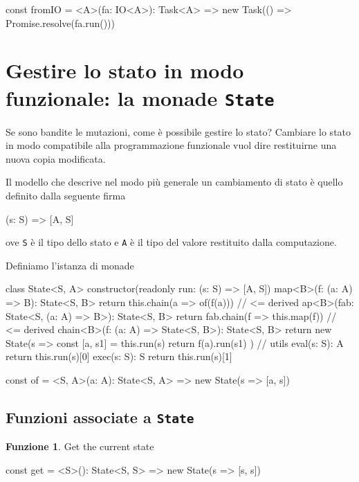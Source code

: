 \documentclass[12pt]{article}
\theoremstyle{definition}
\newtheorem{function}{Funzione}[section]
\newenvironment{code}
  {\vspace{0.5cm} \VerbatimEnvironment\begin{typescriptcode}}
  {\end{typescriptcode} \vspace{0.2cm}}
\begin{document}
\begin{code}
const fromIO = <A>(fa: IO<A>): Task<A> =>
  new Task(() => Promise.resolve(fa.run()))
\end{code}

\newpage

\section{Gestire lo stato in modo funzionale: la monade \texttt{State}}

Se sono bandite le mutazioni, come è possibile gestire lo stato?
Cambiare lo stato in modo compatibile alla programmazione funzionale vuol dire restituirne una nuova copia modificata.

Il modello che descrive nel modo più generale un cambiamento di stato è quello definito dalla seguente firma

\begin{code}
(s: S) => [A, S]
\end{code}

ove \texttt{S} è il tipo dello stato e \texttt{A} è il tipo del valore restituito dalla computazione.

Definiamo l'istanza di monade

\begin{code}
class State<S, A> {
  constructor(readonly run: (s: S) => [A, S]) {}
  map<B>(f: (a: A) => B): State<S, B> {
    return this.chain(a => of(f(a))) // <= derived
  }
  ap<B>(fab: State<S, (a: A) => B>): State<S, B> {
    return fab.chain(f => this.map(f)) // <= derived
  }
  chain<B>(f: (a: A) => State<S, B>): State<S, B> {
    return new State(s => {
      const [a, s1] = this.run(s)
      return f(a).run(s1)
    })
  }
  // utils
  eval(s: S): A {
    return this.run(s)[0]
  }
  exec(s: S): S {
    return this.run(s)[1]
  }
}

const of = <S, A>(a: A): State<S, A> =>
  new State(s => [a, s])
\end{code}

\subsection{Funzioni associate a \texttt{State}}

\begin{function}
Get the current state

\begin{code}
const get = <S>(): State<S, S> =>
  new State(s => [s, s])
\end{code}
\end{function}
\end{document}
